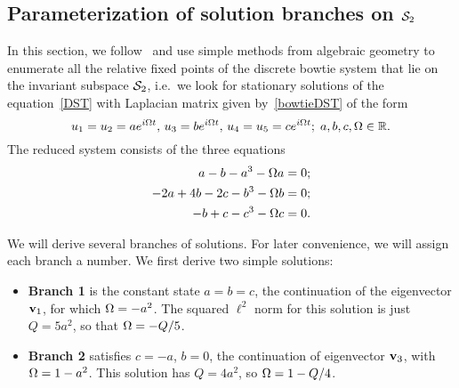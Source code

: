 \documentclass{article}
\numberwithin{equation}{section}
\numberwithin{figure}{section}
\begin{document}
\subsection{Parameterization of solution branches on $\mathcal{S}_2$}
In this section, we follow~\cite{Eilbeck:1985tu} and use simple methods from algebraic geometry to enumerate all the relative fixed points of the discrete bowtie system that lie on the invariant subspace $\mathcal{S}_2$, i.e.\ we look for stationary solutions of the equation~\eqref{DST} with Laplacian matrix given by~\eqref{bowtieDST} of the form
$$
u_1=u_2= a e^{i \Omega t}, \, u_3 = b e^{i \Omega t}, \, u_4=u_5 = c e^{i \Omega t}; \; a,b,c,\Omega \in \mathbb{R}.
$$
The reduced system consists of the three equations
\begin{subequations}
\label{abceqns}
\begin{align}
a-b -a^3 - \Omega a & = 0;\label{abca}\\
-2 a +4 b -2 c -b^3 - \Omega b & = 0;\label{abcb}\\
-b + c -c^3 - \Omega c & = 0.\label{abcc}
\end{align}
\end{subequations}

We will derive several branches of solutions. For later convenience, we will assign each branch a number. We first derive two simple solutions:

\begin{itemize}
\item \textbf{Branch 1} is the constant state $a = b = c$, the continuation of the eigenvector $\mathbf{v}_1$, for which $\Omega = - a^2$. The squared $\ell^2$ norm for this solution is just $Q = 5 a^2$, so that $\Omega = -Q/5$.

\item\textbf{Branch 2} satisfies $c = -a$, $b = 0$, the continuation of eigenvector $\mathbf{v}_3$, with $\Omega = 1-a^2$. This solution has $Q = 4 a^2$, so $\Omega = 1-Q/4$.
\end{itemize}
\end{document}
